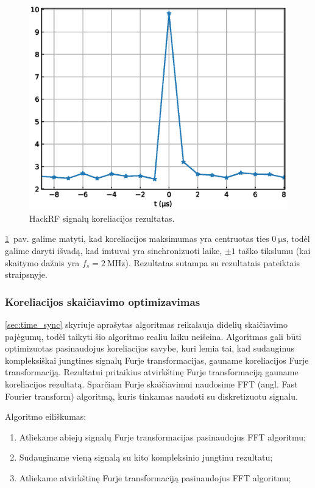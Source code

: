 \documentclass[main.tex]{subfiles}
\begin{document}
\begin{figure}[h]
    \begin{centering}
    \includegraphics[scale=1.0]{drawings/time_sync}
    \par\end{centering}
    \protect\caption{\label{fig:time_sync_result}HackRF signalų koreliacijos rezultatas.}
\end{figure}

\ref{fig:time_sync_result}~pav. galime matyti, kad koreliacijos maksimumas yra centruotas
ties $0\ \mathrm{\mu s}$, todėl galime daryti išvadą, kad imtuvai yra sinchronizuoti laike,
$\pm 1$ taško tikslumu (kai skaitymo dažnis yra $f_s=2\ \mathrm{MHz}$).
Rezultatas sutampa su rezultatais pateiktais \cite{hackrf_sync} straipsnyje.

\subsubsection{Koreliacijos skaičiavimo optimizavimas}

\ref{sec:time_sync} skyriuje aprašytas algoritmas reikalauja didelių skaičiavimo pajėgumų,
todėl taikyti šio algoritmo realiu laiku neišeina. Algoritmas gali būti optimizuotas
pasinaudojus koreliacijos savybe, kuri lemia tai, kad sudauginus kompleksiškai jungtines signalų
Furje transformacijas, gauname koreliacijos Furje transformaciją. Rezultatui pritaikius
atvirkštinę Furje transformaciją gauname koreliacijos rezultatą.
Sparčiam Furje skaičiavimui naudosime FFT (angl. Fast Fourier transform) algoritmą, kuris
tinkamas naudoti su diskretizuotu signalu.

Algoritmo eiliškumas:
\begin{enumerate}
    \item Atliekame abiejų signalų Furje transformacijas pasinaudojus FFT algoritmu;
    \item Sudauginame vieną signalą su kito kompleksinio jungtinu rezultatu;
    \item Atliekame atvirkštinę Furje transformaciją pasinaudojus FFT algoritmu;
\end{enumerate}
\end{document}
